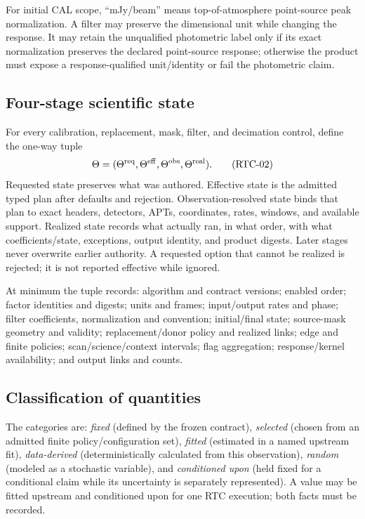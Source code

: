 \documentclass[11pt]{article}
\begin{document}
For initial CAL scope, ``mJy/beam'' means top-of-atmosphere point-source peak
normalization.  A filter may preserve the dimensional unit while changing the
response.  It may retain the unqualified photometric label only if its exact
normalization preserves the declared point-source response; otherwise the
product must expose a response-qualified unit/identity or fail the photometric
claim.

\subsection{Four-stage scientific state}

For every calibration, replacement, mask, filter, and decimation control,
define the one-way tuple
\begin{equation}
 \Theta=(\Theta^{\rm req},\Theta^{\rm eff},
          \Theta^{\rm obs},\Theta^{\rm real}).
 \tag{RTC-02}\label{eq:state}
\end{equation}
Requested state preserves what was authored.  Effective state is the admitted
typed plan after defaults and rejection.  Observation-resolved state binds
that plan to exact headers, detectors, APTs, coordinates, rates, windows, and
available support.  Realized state records what actually ran, in what order,
with what coefficients/state, exceptions, output identity, and product
digests.  Later stages never overwrite earlier authority.  A requested option
that cannot be realized is rejected; it is not reported effective while
ignored.

At minimum the tuple records: algorithm and contract versions; enabled order;
factor identities and digests; units and frames; input/output rates and phase;
filter coefficients, normalization and convention; initial/final state;
source-mask geometry and validity; replacement/donor policy and realized
links; edge and finite policies; scan/science/context intervals; flag
aggregation; response/kernel availability; and output links and counts.

\subsection{Classification of quantities}

The categories are: \emph{fixed} (defined by the frozen contract),
\emph{selected} (chosen from an admitted finite policy/configuration set),
\emph{fitted} (estimated in a named upstream fit), \emph{data-derived}
(deterministically calculated from this observation), \emph{random} (modeled
as a stochastic variable), and \emph{conditioned upon} (held fixed for a
conditional claim while its uncertainty is separately represented).  A value
may be fitted upstream and conditioned upon for one RTC execution; both facts
must be recorded.
\end{document}
